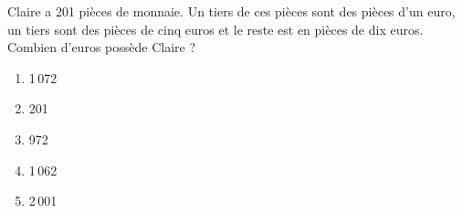Claire a 201 pièces de monnaie. Un tiers de ces pièces sont des pièces d'un euro, un tiers sont des pièces de cinq euros et le reste est en pièces de dix euros. Combien d'euros possède Claire ?
\begin{multicols}{5}
  \begin{enumerate}[A/]
  \item 1\,072
  \item 201
  \item 972
  \item 1\,062
  \item 2\,001
  \end{enumerate}
\end{multicols}